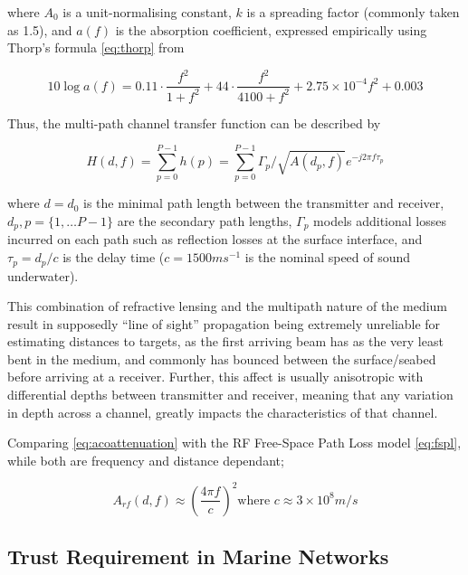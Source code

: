 \documentclass[runningheads,a4paper]{llncs}
\begin{document}
where $A_0$ is a unit-normalising constant, $k$ is a spreading factor (commonly taken as 1.5), and $a(f)$ is the absorption coefficient, expressed empirically using Thorp's formula \eqref{eq:thorp} from \cite{Stojanovic2007}

\begin{equation}
  \label{eq:thorp}
  10 \log a(f) = 0.11 \cdot \frac{f^2}{1+f^2} + 44\cdot\frac{f^2}{4100+f^2}+ 2.75\times10^{-4} f^2 + 0.003
\end{equation}


Thus, the multi-path channel transfer function can be described by 

\begin{equation}
  \label{eq:acomultipath}
  H(d,f) =\sum_{p=0}^{P-1} h(p) = \sum_{p=0}^{P-1} \Gamma_p / \sqrt{A(d_p,f)}e^{-j 2 \pi f \tau_p}
\end{equation}

where $d=d_0$ is the minimal path length between the transmitter and receiver, $d_p,p=\{1,\dots P-1\}$ are the secondary path lengths, $\Gamma_p$ models additional losses incurred on each path such as reflection losses at the surface interface, and $\tau_p = d_p/c$ is the delay time ($c = 1500 ms^{-1}$ is the nominal speed of sound underwater).


This combination of refractive lensing and the multipath nature of the medium result in supposedly ``line of sight'' propagation being extremely unreliable for estimating distances to targets, as the first arriving beam has as the very least bent in the medium, and commonly has bounced between the surface/seabed before arriving at a receiver. Further, this affect is usually anisotropic with differential depths between transmitter and receiver, meaning that any variation in depth across a channel, greatly impacts the characteristics of that channel.

Comparing \eqref{eq:acoattenuation} with the RF Free-Space Path Loss model \eqref{eq:fspl}, while both are frequency and distance dependant; 

\begin{equation}
  \label{eq:fspl}
  A_{rf}(d,f) \approx \left( \frac{4\pi f}{c} \right)^2
  \text{where }c\approx 3\times10^8m/s
\end{equation}



\subsection{Trust Requirement in Marine Networks}
\end{document}
